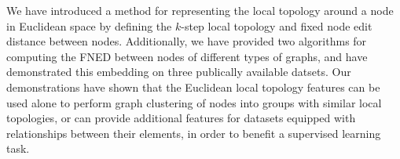 \documentclass{article}
\begin{document}
We have introduced a method for representing the local topology around a node in Euclidean space by defining the $k$-step local topology and fixed node edit distance between nodes. Additionally, we have provided two algorithms for computing the FNED between nodes of different types of graphs, and have demonstrated this embedding on three publically available datsets. Our demonstrations have shown that the Euclidean local topology features can be used alone to perform graph clustering of nodes into groups with similar local topologies, or can provide additional features for datasets equipped with relationships between their elements, in order to benefit a supervised learning task. 


\begin{small}

 
\end{small}
\end{document}
